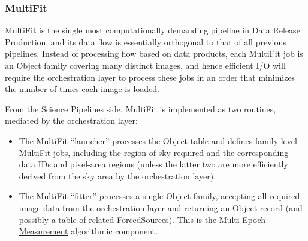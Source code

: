\subsubsection{MultiFit}
\label{sec:drpMultiFit}

MultiFit is the single most computationally demanding pipeline in Data Release Production, and its data flow is essentially orthogonal to that of all previous pipelines.  Instead of processing flow based on data products, each MultiFit job is an Object family covering many distinct images, and hence efficient I/O will require the orchestration layer to process these jobs in an order that minimizes the number of times each image is loaded.

From the Science Pipelines side, MultiFit is implemented as two routines, mediated by the orchestration layer:
\begin{itemize}
\item The MultiFit ``launcher'' processes the Object table and defines family-level MultiFit jobs, including the region of sky required and the corresponding data IDs and pixel-area regions (unless the latter two are more efficiently derived from the sky area by the orchestration layer).
\item The MultiFit ``fitter'' processes a single Object family, accepting all required image data from the orchestration layer and returning an Object record (and possibly a table of related ForcedSources).  This is the \hyperref[sec:acMultiEpochMeasurement]{Multi-Epoch Measurement} algorithmic component.
\end{itemize}

